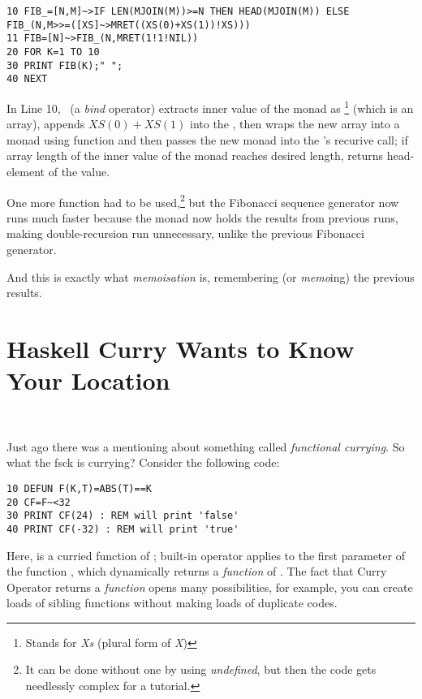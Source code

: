 \begin{lstlisting}
10 FIB_=[N,M]~>IF LEN(MJOIN(M))>=N THEN HEAD(MJOIN(M)) ELSE FIB_(N,M>>=([XS]~>MRET((XS(0)+XS(1))!XS)))
11 FIB=[N]~>FIB_(N,MRET(1!1!NIL))
20 FOR K=1 TO 10
30 PRINT FIB(K);" ";
40 NEXT
\end{lstlisting}

In Line 10, \basicmbind\ (a \emph{bind} operator) extracts inner value of the monad  as \footnote{Stands for \emph{Xs} (plural form of \emph{X})} (which is an array), appends $XS(0) + XS(1)$ into the , then wraps the new array into a monad using  function and then passes the new monad into the 's recurive call; if array length of the inner value of the monad reaches desired length, returns head-element of the value.

One more function  had to be used,\footnote{It can be done without one by using \emph{undefined}, but then the code gets needlessly complex for a tutorial.} but the Fibonacci sequence generator now runs much faster because the monad now holds the results from previous runs, making double-recursion run unnecessary, unlike the previous Fibonacci generator.

And this is exactly what \emph{memoisation} is, remembering (or \emph{memo}ing) the previous results.

\section[Currying]{Haskell Curry Wants to Know Your Location}
\label{currying101}

\vspace*{-\mytextsize}\ \par %
Just \setcounter{curryingselfref}{\value{page} - \value{curryingappearance}} ago there was a mentioning about something called \emph{functional currying}. So what the fsck is currying? Consider the following code:

\begin{lstlisting}
10 DEFUN F(K,T)=ABS(T)==K
20 CF=F~<32
30 PRINT CF(24) : REM will print 'false'
40 PRINT CF(-32) : REM will print 'true'
\end{lstlisting}

Here,  is a curried function of ; built-in operator \code{\basiccurry} applies  to the first parameter of the function , which dynamically returns a \emph{function} of . The fact that Curry Operator returns a \emph{function} opens many possibilities, for example, you can create loads of sibling functions without making loads of duplicate codes.

